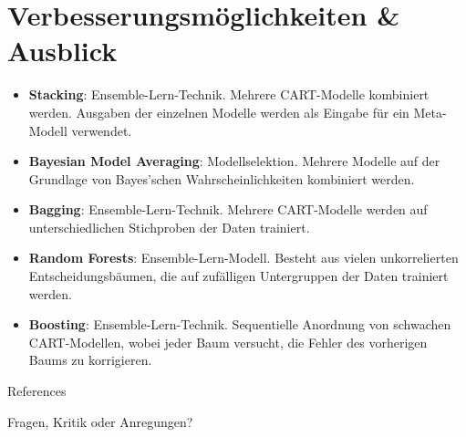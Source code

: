 \documentclass{beamer}
\begin{document}

\section{Verbesserungsmöglichkeiten \& Ausblick}

\begin{frame}
		\begin{itemize}
			\item\textbf{Stacking}: Ensemble-Lern-Technik. Mehrere CART-Modelle kombiniert werden. Ausgaben der einzelnen Modelle  werden als Eingabe für ein Meta-Modell verwendet.
			\item\textbf{Bayesian Model Averaging}: Modellselektion. Mehrere Modelle auf der Grundlage von Bayes'schen Wahrscheinlichkeiten kombiniert werden.
			\item\textbf{Bagging}: Ensemble-Lern-Technik. Mehrere CART-Modelle werden auf unterschiedlichen Stichproben der Daten trainiert.
			\item\textbf{Random Forests}: Ensemble-Lern-Modell. Besteht aus vielen unkorrelierten Entscheidungsbäumen, die auf zufälligen Untergruppen der Daten trainiert werden.
			\item\textbf{Boosting}: Ensemble-Lern-Technik. Sequentielle Anordnung von schwachen CART-Modellen, wobei jeder Baum versucht, die Fehler des vorherigen Baums zu korrigieren.
		\end{itemize}
\end{frame}



\appendix

\begin{frame}[allowframebreaks]{References}
	
	\nocite{*}
	
\end{frame}

\begin{frame}[focus]

	Fragen, Kritik oder Anregungen?
	
\end{frame}

\end{document}

